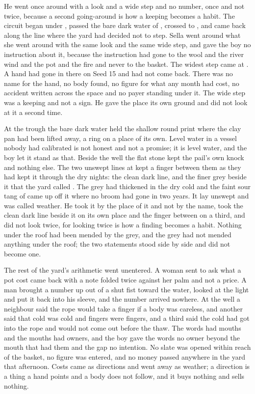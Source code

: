 \scenebreak

He went once around  with a look and a wide step and no number, once and not twice, because a second going-around is how a keeping becomes a habit. The circuit began under , passed the bare dark water of , crossed to , and came back along the line where the yard had decided not to step. Sella went around what she went around with the same look and the same wide step, and gave the boy no instruction about it, because the instruction had gone to the wool and the river wind and the pot and the fire and never to the basket. The widest step came at . A hand had gone in there on Seed 15 and had not come back. There was no name for the hand, no body found, no figure for what any month had cost, no accident written across the space and no payer standing under it. The wide step was a keeping and not a sign. He gave the place its own ground and did not look at it a second time.

At the trough the bare dark water held the shallow round print where the clay pan had been lifted away, a ring on a place of its own. Level water in a vessel nobody had calibrated is not honest and not a promise; it is level water, and the boy let it stand as that. Beside the well the flat stone kept the pail's own knock and nothing else. The two unswept lines at  kept a finger between them as they had kept it through the dry nights: the clean dark line, and the finer grey beside it that the yard called . The grey had thickened in the dry cold and the faint sour tang of  came up off it where no broom had gone in two years. It lay unswept and was called weather. He took it by the place of it and not by the name, took the clean dark line beside it on its own place and the finger between on a third, and did not look twice, for looking twice is how a finding becomes a habit. Nothing under the roof had been mended by the grey, and the grey had not mended anything under the roof; the two statements stood side by side and did not become one.

The rest of the yard's arithmetic went unentered. A woman sent to ask what a pot cost came back with a note folded twice against her palm and not a price. A man brought a number up out of a shut fist toward the water, looked at the light and put it back into his sleeve, and the number arrived nowhere. At the well a neighbour said the rope would take a finger if a body was careless, and another said that cold was cold and fingers were fingers, and a third said the cold had got into the rope and would not come out before the thaw. The words had mouths and the mouths had owners, and the boy gave the words no owner beyond the mouth that had them and the gap no intention. No slate was opened within reach of the basket, no figure was entered, and no money passed anywhere in the yard that afternoon. Costs came as directions and went away as weather; a direction is a thing a hand points and a body does not follow, and it buys nothing and sells nothing.

